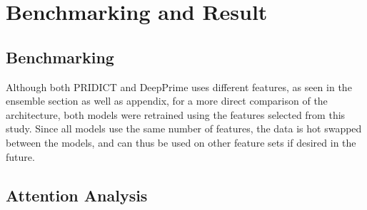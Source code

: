 \chapter{Benchmarking and Result}

\section{Benchmarking}

Although both PRIDICT and DeepPrime uses different features, as seen in the ensemble section as well as appendix, for a more direct comparison of the architecture, both models were retrained using the features selected from this study. Since all models use the same number of features, the data is hot swapped between the models, and can thus be used on other feature sets if desired in the future. 

\section{Attention Analysis}